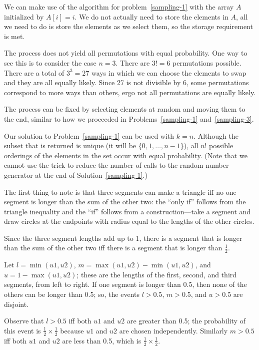 We can make use of the algorithm for 
problem~\ref{sampling-1} with the array $A$ initialized by $A[i] = i$.
We do not actually need to store the elements in $A$, all we need to do is store
the elements as we select them, so the storage requirement is met.

The process does not yield all permutations with equal probability. One way to 
see this is to consider the case $n=3$.  There are $3! = 6$ permutations possible. 
There are a total of $3^3 = 27$ ways in 
which we can choose the elements to swap and they are all
equally likely. Since 27 is not divisible by 6, some
permutations correspond to more ways than others, ergo not all permutations
are equally likely.

The process can be fixed by selecting elements at random and 
moving them to the end, similar to how we proceeded in Problems~\ref{sampling-1}
and~\ref{sampling-3}.

Our solution to Problem~\ref{sampling-1} can be used with 
$k=n$.  Although the subset that is returned is unique (it will be $\{0,1,\ldots,n-1\}$),
all $n!$ possible orderings of the elements in the set occur with equal
probability. (Note that we cannot use the trick to reduce the number of calls
to the random number generator at the end of Solution~\ref{sampling-1}.)

The first thing to note is that three segments can make a triangle iff
no one segment is longer than the sum of the other two:
the ``only if'' follows from the triangle inequality and the ``if''
follows from a construction---take a segment and draw circles at the
endpoints
 with radius equal to the lengths of the other circles.

Since the three segment lengths add up to 1, 
there is a segment that is longer than the sum of the other two iff
there is a segment that is longer than $\frac{1}{2}$. 

Let $l = \min{(u1,u2)}$, 
$m = \max{(u1,u2)} - \min{(u1,u2)}$, and $ u = 1 - \max{(u1,u2)}$;
these are the lengths of the first, second, and third segments,
from left to right.
If one segment is longer than 0.5, then none of the others
can be longer than 0.5; so, the events $l > 0.5$,
$m > 0.5$, and $u > 0.5$ are disjoint.

Observe that $l > 0.5$ iff both $u1$ and $u2$ are greater than 0.5;
the probability of this event is $\frac{1}{2} \times \frac{1}{2}$ because $u1$ and $u2$ are chosen independently.
Similarly $m > 0.5$ iff both $u1$ and $u2$ are less than 0.5, which is $\frac{1}{2} \times \frac{1}{2}$.

